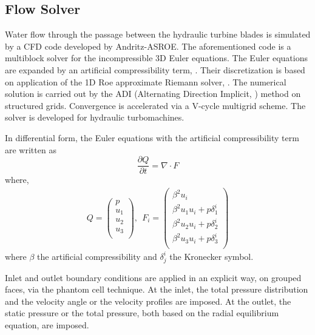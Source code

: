 \FloatBarrier
\subsection{Flow Solver}
\label{FlowSolvert}
Water flow through the passage between the hydraulic turbine blades is simulated by a CFD code developed by Andritz-ASROE. The aforementioned code is a multiblock solver for the incompressible 3D Euler equations. The Euler equations are expanded by an artificial compressibility term, \cite{Chorin,Turkel87}. Their discretization is based on application of the 1D Roe approximate Riemann solver, \cite{Roe81}. The numerical solution is carried out by the ADI (Alternating Direction Implicit, \cite{Peaceman}) method on structured grids. Convergence is accelerated via a V-cycle multigrid scheme. The solver is developed for hydraulic turbomachines.


In differential form, the Euler equations with the artificial compressibility term are written as
\begin{equation} 
    \frac{\partial Q}{\partial t}=\nabla \cdot F
	\label{Euler1}
\end{equation}
where,
\begin{eqnarray}
		Q= \left( {\begin{array}{c}
 		p    \\
 		u_1  \\
 		u_2  \\
 		u_3  \\
 		\end{array} } \right)
 		, ~~ F_i= \left( {\begin{array}{c}
 		\beta ^2 u_i    \\
 		\beta ^2 u_1u_i + p\delta _1^i  \\
		\beta ^2 u_2u_i + p\delta _2^i  \\
 		\beta ^2 u_3u_i + p\delta _3^i  \\
 		\end{array} } \right)
\label{Euler3}
\end{eqnarray} 
where $\beta$ the artificial compressibility \cite{Chorin,Turkel87} and $\delta^i_j$ the Kronecker symbol.

Inlet and outlet boundary conditions are applied in an explicit way, on grouped faces, via the phantom cell technique. At the inlet, the total pressure distribution and the velocity angle or the velocity profiles are imposed. At the outlet, the static pressure or the total pressure, both based on the radial equilibrium equation, are imposed. 

